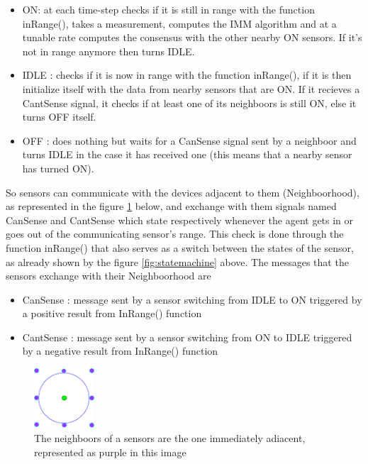 \documentclass[twocolumn]{article}
\begin{document}
\begin{itemize}
    \item ON: at each time-step checks if it is still in range with the function inRange(), takes a measurement, computes the IMM algorithm and 
             at a tunable rate computes the consensus with the other nearby ON sensors. If it's not in range anymore then turns IDLE.
    \item IDLE : checks if it is now in range with the function inRange(), if it is then initialize itself with the data from nearby sensors 
                that are ON. If it recieves a CantSense signal, it checks if at least one of its neighboors is still ON, else it turns OFF itself.
    \item OFF : does nothing but waits for a CanSense signal sent by a neighboor and turns IDLE in the case it has received one (this means that 
                a nearby sensor has turned ON).
\end{itemize}
    So sensors can communicate with the devices adjacent to them (Neighboorhood), as represented in the figure \ref{fig:neighboors} below, 
    and exchange with them signals named CanSense and CantSense which state respectively whenever the agent gets in or goes out of the 
    communicating sensor's range. This check is done through the function inRange() that also serves as a switch between the states of the 
    sensor, as already shown by the figure \ref{fig:statemachine} above.
    The messages that the sensors exchange with their Neighboorhood are
\begin{itemize} 
    \item CanSense : message sent by a sensor switching from IDLE to ON triggered by a positive result from InRange() function
    \item CantSense : message sent by a sensor switching from ON to IDLE triggered by a negative result from InRange() function
\end{itemize}
    \begin{figure}[h!]
        \centering
        \includegraphics[width=0.2\textwidth]{Immagini/2sensor.png}
        \caption{The neighboors of a sensors are the one immediately adiacent, represented as purple in this image}
        \label{fig:neighboors}
    \end{figure}
\end{document}
